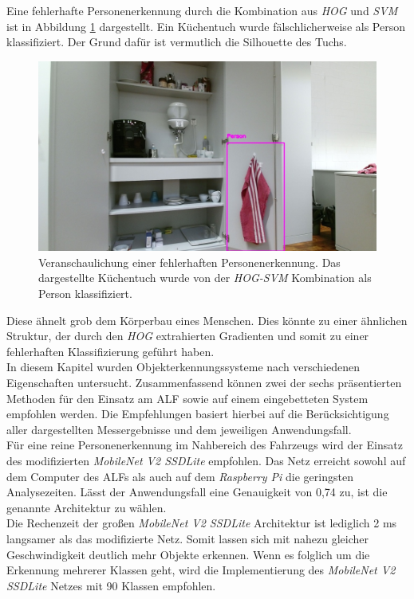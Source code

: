 Eine fehlerhafte Personenerkennung durch die Kombination aus \textit{HOG} und \textit{SVM} ist in Abbildung \ref{fig: hogtest} dargestellt. Ein Küchentuch wurde fälschlicherweise als Person klassifiziert. Der Grund dafür ist vermutlich die Silhouette des Tuchs.\\

	\begin{figure}[H]
	\centering
	\includegraphics[width=1\textwidth]{Bilder/80.jpg}
	\caption{Veranschaulichung einer fehlerhaften Personenerkennung. Das dargestellte Küchentuch wurde von der \textit{HOG-SVM} Kombination als Person klassifiziert.}
	\label{fig: hogtest}
\end{figure}

 Diese ähnelt grob dem Körperbau eines Menschen. Dies könnte zu einer ähnlichen Struktur, der durch den \textit{HOG} extrahierten Gradienten und somit zu einer fehlerhaften Klassifizierung geführt haben.\\





In diesem Kapitel wurden Objekterkennungssysteme nach verschiedenen Eigenschaften untersucht. Zusammenfassend können zwei der sechs präsentierten Methoden für den Einsatz am ALF sowie auf einem eingebetteten System empfohlen werden. Die Empfehlungen basiert hierbei auf die Berücksichtigung aller dargestellten Messergebnisse und dem jeweiligen Anwendungsfall.\\

Für eine reine Personenerkennung im Nahbereich des Fahrzeugs wird der Einsatz des modifizierten \textit{MobileNet V2 SSDLite} empfohlen. Das Netz erreicht sowohl auf dem Computer des ALFs als auch auf dem \textit{Raspberry Pi} die geringsten Analysezeiten. Lässt der Anwendungsfall eine Genauigkeit von 0,74 zu, ist die genannte Architektur zu wählen.\\

Die Rechenzeit der großen \textit{MobileNet V2 SSDLite} Architektur ist lediglich 2 ms langsamer als das modifizierte Netz. Somit lassen sich mit nahezu gleicher Geschwindigkeit deutlich mehr Objekte erkennen. Wenn es folglich um die Erkennung mehrerer Klassen geht, wird die Implementierung des \textit{MobileNet V2 SSDLite} Netzes mit 90 Klassen empfohlen.\\ 